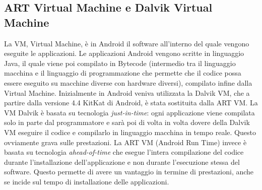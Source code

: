 \subsection{ART Virtual Machine e Dalvik Virtual Machine}
La VM, Virtual Machine, è in Android il software all’interno del
quale vengono eseguite le applicazioni. Le applicazioni Android vengono scritte in
linguaggio Java, il quale viene poi compilato in Bytecode
(intermedio tra il linguaggio macchina e il linguaggio di
programmazione che permette che il codice possa essere eseguito su macchine
diverse con hardware diversi), compilato infine
dalla Virtual Machine. Inizialmente in Android veniva utilizzata la Dalvik VM,
che a partire dalla versione 4.4 KitKat di Android, è stata sostituita dalla ART
VM.
La VM Dalvik è basata su tecnologia \textit{just-in-time}: ogni applicazione viene
compilata solo in parte dal programmatore e sarà poi di volta in volta dovere
della Dalvik VM eseguire il codice e compilarlo in linguaggio macchina in tempo
reale. Questo ovviamente grava sulle prestazioni.
La ART VM (Android Run Time) invece è basata su tecnologia \textit{ahead-of-time} che esegue l'intera
compilazione del codice durante l'installazione dell'applicazione e non durante
l'esecuzione stessa del software. Questo permette di avere un vantaggio in
termine di prestazioni, anche se incide sul tempo di installazione delle
applicazioni.


